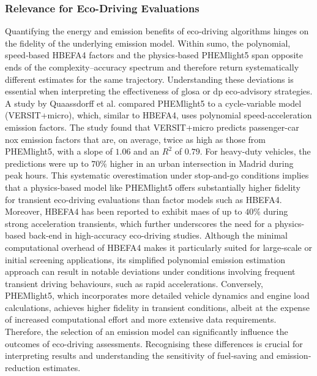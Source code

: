 \subsubsection{Relevance for Eco-Driving Evaluations}
\label{subsubsec:relevance_eco_driving}
Quantifying the energy and emission benefits of eco‐driving algorithms hinges on the fidelity of the underlying emission model. Within \ac{sumo}, the polynomial, speed‐based HBEFA4 factors and the physics‐based PHEMlight5 span opposite ends of the complexity–accuracy spectrum and therefore return systematically different estimates for the same trajectory. Understanding these deviations is essential when interpreting the effectiveness of \ac{glosa} or \ac{dp} eco‐advisory strategies. 
\mynewline
A study by Quaassdorff et al. \cite{Quaassdorff2022} compared PHEMlight5 to a cycle-variable model (VERSIT+micro), which, similar to HBEFA4, uses polynomial speed-acceleration emission factors. The study found that VERSIT+micro predicts passenger-car \ac{nox} emission factors that are, on average, twice as high as those from PHEMlight5, with a slope of $1.06$ and an $R^2$ of $0.79$. For heavy-duty vehicles, the predictions were up to $70\%$ higher in an urban intersection in Madrid during peak hours. This systematic overestimation under stop-and-go conditions implies that a physics-based model like PHEMlight5 offers substantially higher fidelity for transient eco-driving evaluations than factor models such as HBEFA4. Moreover, HBEFA4 has been reported to exhibit \acp{mae} of up to $40\%$ during strong acceleration transients, which further underscores the need for a physics-based back-end in high-accuracy eco-driving studies. \cite{Krajzewicz2002}
\mynewline
Although the minimal computational overhead of HBEFA4 makes it particularly suited for large‐scale or initial screening applications, its simplified polynomial emission estimation approach can result in notable deviations under conditions involving frequent transient driving behaviours, such as rapid accelerations. Conversely, PHEMlight5, which incorporates more detailed vehicle dynamics and engine load calculations, achieves higher fidelity in transient conditions, albeit at the expense of increased computational effort and more extensive data requirements. Therefore, the selection of an emission model can significantly influence the outcomes of eco-driving assessments. Recognising these differences is crucial for interpreting results and understanding the sensitivity of fuel‐saving and emission‐reduction estimates.


